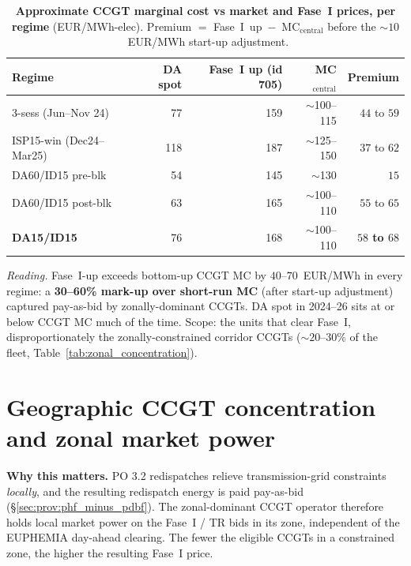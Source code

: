\documentclass[11pt,a4paper]{article}
\begin{document}
\begin{table}[H]
\centering\scriptsize
\caption{\textbf{Approximate CCGT marginal cost vs market and Fase~I prices, per regime} (EUR/MWh-elec). Premium $=$ Fase~I~up~$-$~MC$_{\text{central}}$ before the $\sim\!10$~EUR/MWh start-up adjustment.}
\label{tab:mc_ccgt_premium}
\setlength{\tabcolsep}{5pt}
\begin{tabular}{l r r r r}
\toprule
Regime & DA spot & Fase~I up (id 705) & MC$_{\text{central}}$ & Premium \\
\midrule
3-sess (Jun--Nov 24) & 77 & 159 & $\sim$100--115 & $44$ to $59$ \\
ISP15-win (Dec24--Mar25) & 118 & 187 & $\sim$125--150 & $37$ to $62$ \\
DA60/ID15 pre-blk & 54 & 145 & $\sim$130 & $15$ \\
DA60/ID15 post-blk & 63 & 165 & $\sim$100--110 & $55$ to $65$ \\
\textbf{DA15/ID15} & 76 & 168 & $\sim$100--110 & \textbf{$58$ to $68$} \\
\bottomrule
\end{tabular}
\end{table}

\textit{Reading.} Fase~I-up exceeds bottom-up CCGT MC by $40$--$70$~EUR/MWh in every regime: a \textbf{30--60\% mark-up over short-run MC} (after start-up adjustment) captured pay-as-bid by zonally-dominant CCGTs. DA spot in 2024--26 sits at or below CCGT MC much of the time. Scope: the units that clear Fase~I, disproportionately the zonally-constrained corridor CCGTs ($\sim\!20$--$30\%$ of the fleet, Table~\ref{tab:zonal_concentration}).


\section{Geographic CCGT concentration and zonal market power}\label{sec:prov:geo}

\textbf{Why this matters.} PO 3.2 redispatches relieve transmission-grid constraints \emph{locally}, and the resulting redispatch energy is paid pay-as-bid (\S\ref{sec:prov:phf_minus_pdbf}). The zonal-dominant CCGT operator therefore holds local market power on the Fase~I / TR bids in its zone, independent of the EUPHEMIA day-ahead clearing. The fewer the eligible CCGTs in a constrained zone, the higher the resulting Fase~I price.
\end{document}
